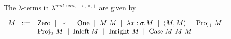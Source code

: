 The $ \lambda $-terms in $ \lambda ^{ null, unit, \to , \times , + } $ are given by
\begin{center}
$
\begin{array}{rl}
M \hspace*{6pt} ::= & \text{Zero} \hspace*{6pt} | \hspace*{6pt} \ast \hspace*{6pt} | \hspace*{6pt} \text{One} \hspace*{6pt} | \hspace*{6pt} M \text{ } M \hspace*{6pt} | \hspace*{6pt} \lambda x: \sigma .M \hspace*{6pt} | \hspace*{6pt} \langle M,M \rangle \hspace*{6pt} | \hspace*{6pt} \text{Proj}_1 \text{ } M \hspace*{6pt} | \\
  & \text{Proj}_2 \text{ } M \hspace*{6pt} | \hspace*{6pt}\text{Inleft} \text{ } M \hspace*{6pt} | \hspace*{6pt} \text{Inright} \text{ } M \hspace*{6pt} | \hspace*{6pt} \text{Case} \text{ } M \text{ } M \text{ } M
\end{array}
$
\end{center}